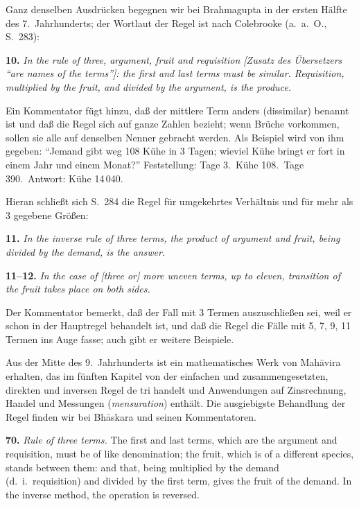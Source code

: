 \documentclass[11pt,a4paper]{article}
\newcommand{\enquote}[1]{``#1''}
\begin{document}
Ganz denselben Ausdr\"ucken begegnen wir bei Brahmagupta in der ersten H\"alfte des 7.\ Jahrhunderts; der Wortlaut der Regel ist nach Colebrooke (a.\ a.\ O., S.\ 283):

\textbf{10.} \textit{In the rule of three, argument, fruit and requisition [Zusatz des \"Ubersetzers \enquote{are names of the terms}]: the first and last terms must be similar. Requisition, multiplied by the fruit, and divided by the argument, is the produce.}

Ein Kommentator f\"ugt hinzu, da\ss{} der mittlere Term anders (dissimilar) benannt ist und da\ss{} die Regel sich auf ganze Zahlen bezieht; wenn Br\"uche vorkommen, sollen sie alle auf denselben Nenner gebracht werden. Als Beispiel wird von ihm gegeben: \enquote{Jemand gibt weg 108 K\"uhe in 3 Tagen; wieviel K\"uhe bringt er fort in einem Jahr und einem Monat?} Feststellung: Tage 3.\ K\"uhe 108.\ Tage 390.\ Antwort: K\"uhe 14\,040.

Hieran schlie\ss{}t sich S.\ 284 die Regel f\"ur umgekehrtes Verh\"altnis und f\"ur mehr als 3 gegebene Gr\"o\ss{}en:

\textbf{11.} \textit{In the inverse rule of three terms, the product of argument and fruit, being divided by the demand, is the answer.}

\textbf{11--12.} \textit{In the case of [three or] more uneven terms, up to eleven, transition of the fruit takes place on both sides.}

Der Kommentator bemerkt, da\ss{} der Fall mit 3 Termen auszuschlie\ss{}en sei, weil er schon in der Hauptregel behandelt ist, und da\ss{} die Regel die F\"alle mit 5, 7, 9, 11 Termen ins Auge fasse; auch gibt er weitere Beispiele.

Aus der Mitte des 9.\ Jahrhunderts ist ein mathematisches Werk von Mah\=avira erhalten, das im f\"unften Kapitel von der einfachen und zusammengesetzten, direkten und inversen Regel de tri handelt und Anwendungen auf Zinsrechnung, Handel und Messungen (\textit{mensuration}) enth\"alt. Die ausgiebigste Behandlung der Regel finden wir bei Bh\=askara und seinen Kommentatoren.

\textbf{70.} \textit{Rule of three terms.} The first and last terms, which are the argument and requisition, must be of like denomination; the fruit, which is of a different species, stands between them: and that, being multiplied by the demand (d.\ i.\ requisition) and divided by the first term, gives the fruit of the demand. In the inverse method, the operation is reversed.
\end{document}
